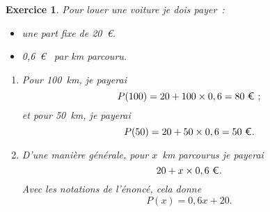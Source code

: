\documentclass[10pt]{article}
\newtheorem{exo}{Exercice}
\begin{document}
\begin{exo}

Pour louer une voiture je dois payer~:

\begin{itemize}
\item[\textbullet] une part fixe de 20~\euro.
\item[\textbullet] 0,6~\euro~{} par km parcouru.
\end{itemize}

\medskip

\begin{enumerate}
\item Pour 100~km, je payerai \[P(100)=20+100\times 0,6=80~\text{\euro}~;\] et pour 50~km, je payerai \[P(50)=20+50\times 0,6=50~\text{\euro}.\]

\item D'une manière générale, pour $x$~km parcourus je payerai
\[20+x\times 0,6~\text{\euro}.\] Avec les notations de l'énoncé, cela donne
\[P(x)=0,6x+20.\]
\end{enumerate}

\end{exo}
\end{document}
